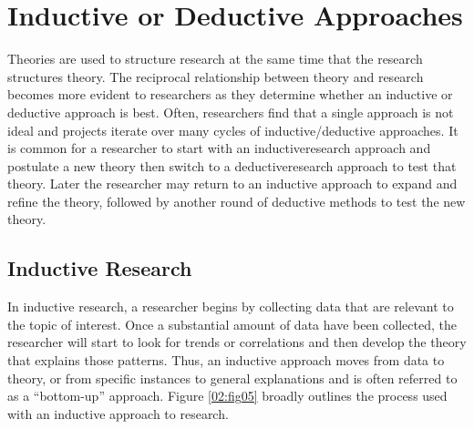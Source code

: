 \section{Inductive or Deductive Approaches}

Theories are used to structure research at the same time that the research structures theory. The reciprocal relationship between theory and research becomes more evident to researchers as they determine whether an inductive or deductive approach is best. Often, researchers find that a single approach is not ideal and projects iterate over many cycles of inductive/deductive approaches. It is common for a researcher to start with an \gls{inductiveresearch} approach and postulate a new theory then switch to a \gls{deductiveresearch} approach to test that theory. Later the researcher may return to an inductive approach to expand and refine the theory, followed by another round of deductive methods to test the new theory.

\subsection{Inductive Research}

In inductive research, a researcher begins by collecting data that are relevant to the topic of interest. Once a substantial amount of data have been collected, the researcher will start to look for trends or correlations and then develop the theory that explains those patterns. Thus, an inductive approach moves from data to theory, or from specific instances to general explanations and is often referred to as a ``bottom-up'' approach. Figure \ref{02:fig05} broadly outlines the process used with an inductive approach to research.

